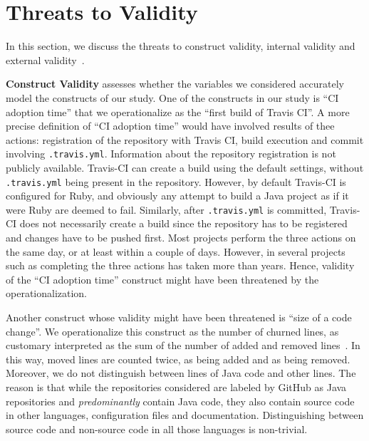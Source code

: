 
\section{Threats to Validity}
\label{sec:threats}
In this section, we discuss the threats to construct validity, internal validity  and external validity~\cite{perry2000empirical}.

\textbf{Construct Validity} assesses whether the variables we considered accurately model the constructs of our study. 
One of the constructs in our study is ``CI adoption time'' that we operationalize as the ``first build of Travis CI''. 
A more precise definition of ``CI adoption time'' would have involved results of thee actions: registration of the repository with Travis CI, build execution and commit involving \texttt{.travis.yml}.
Information about the repository registration is not publicly available. 
Travis-CI can create a build using the default settings, without \texttt{.travis.yml} being present in the repository.
However, by default Travis-CI is configured for Ruby, and obviously any attempt to build a Java project as if it were Ruby are deemed to fail.
Similarly, after \texttt{.travis.yml} is committed, Travis-CI does not necessarily create a build since the repository has to be registered and changes have to be pushed first. 
Most projects perform the three actions on the same day, or at least within a couple of days.
However, in several projects such as  completing the three actions has taken more than  years.
Hence, validity of the ``CI adoption time'' construct might have been threatened by the operationalization.

Another construct whose validity might have been threatened is ``size of a code change''.
We operationalize this construct as the number of churned lines, as customary interpreted as the sum of the number of added 
and removed lines~\cite{GigerPG}. 
In this way, moved lines are counted twice, as being added and as being removed.
Moreover, we do not distinguish between lines of Java code and other lines. 
The reason is that while the repositories considered are labeled by GitHub as Java repositories and \emph{predominantly} contain Java code,
they also contain source code in other languages, configuration files and documentation. 
Distinguishing between source code and non-source code in all those languages is non-trivial.

